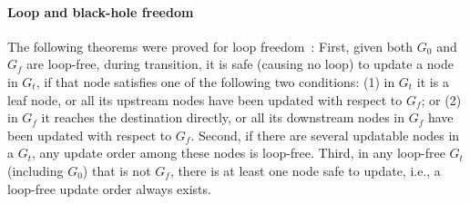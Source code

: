 \paragraph{Loop and black-hole freedom}

The following theorems were proved for loop freedom~\cite{loopfree}:
First, given both $G_0$ and $G_f$ are loop-free,
during transition, it is safe (causing no loop) to update a node in  $G_t$, if that node satisfies 
one of the following two conditions: (1) in $G_t$ it is a leaf node, or all its upstream nodes
have been updated with respect to $G_f$; or (2) in $G_f$ it reaches the destination directly,
or all its downstream nodes in $G_f$ have been updated with respect to $G_f$.
Second, if there are several updatable nodes in a $G_t$, any update order among these nodes is
loop-free. Third, in any loop-free $G_t$ (including $G_0$) that is not $G_f$,
there is at least one node safe to update, i.e., a loop-free update order always exists.


%
%

